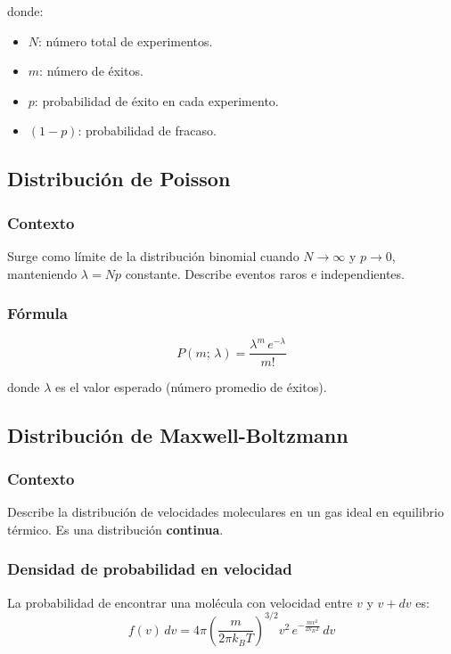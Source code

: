 donde:
\begin{itemize}
    \item $N$: número total de experimentos.
    \item $m$: número de éxitos.
    \item $p$: probabilidad de éxito en cada experimento.
    \item $(1-p)$: probabilidad de fracaso.
\end{itemize}

\subsection{Distribución de Poisson}

\subsubsection{Contexto}

Surge como límite de la distribución binomial cuando $N \to \infty$ y $p \to 0$, manteniendo $\lambda = Np$ constante. Describe eventos raros e independientes.

\subsubsection{Fórmula}

$$
P(m;\, \lambda) = \frac{\lambda^m \, e^{-\lambda}}{m!}
$$

donde $\lambda$ es el valor esperado (número promedio de éxitos).

\subsection{Distribución de Maxwell-Boltzmann}

\subsubsection{Contexto}

Describe la distribución de velocidades moleculares en un gas ideal en equilibrio térmico. Es una distribución \textbf{continua}.

\subsubsection{Densidad de probabilidad en velocidad}

La probabilidad de encontrar una molécula con velocidad entre $v$ y $v + dv$ es:
$$
f(v)\, dv = 4\pi \left(\frac{m}{2\pi k_B T}\right)^{3/2} v^2 \, e^{-\frac{mv^2}{2k_B T}}\, dv
$$


